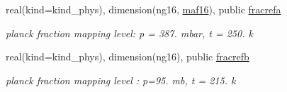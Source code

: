 \begin{Indent}
\begin{DoxyCompactItemize}
real(kind=kind\+\_\+phys), dimension(ng16, \hyperlink{group__module__radlw__kgbnn_gaae4c96f4a2ae49c573189f2d63ccd4a3}{maf16}), public \hyperlink{group__module__radlw__kgbnn_ga355dcc9f6f4955ab3d7ee0a22005c8ba}{fracrefa}
\begin{DoxyCompactList}\small\item\em planck fraction mapping level\+: p = 387. mbar, t = 250. k \end{DoxyCompactList}\item 
real(kind=kind\+\_\+phys), dimension(ng16), public \hyperlink{group__module__radlw__kgbnn_gab93affafac8e2bb182982133a6449de4}{fracrefb}
\begin{DoxyCompactList}\small\item\em planck fraction mapping level \+: p=95. mb, t = 215. k \end{DoxyCompactList}\end{DoxyCompactItemize}
\end{Indent}
